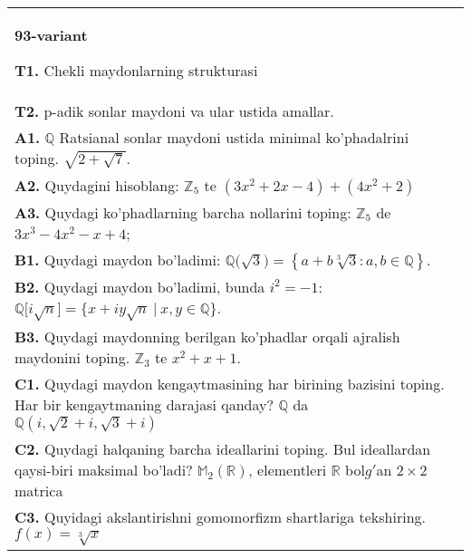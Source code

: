 \documentclass{article}
\begin{document}
\begin{tabular}{m{17cm}}
\textbf{93-variant}
\newline

\textbf{T1.} Chekli maydonlarning strukturasi \\
\textbf{T2.} p-adik sonlar maydoni va ular ustida amallar. \\
\textbf{A1.} \(\mathbb{Q}\) Ratsianal sonlar maydoni ustida minimal ko'phadalrini toping.
\(\sqrt{2 + \sqrt{7}}\). \\
\textbf{A2.} Quydagini hisoblang:
\(\mathbb{Z}_{5}\) te \(\left( 3x^{2} + 2x - 4 \right) + \left( 4x^{2} + 2 \right)\) \\
\textbf{A3.} Quydagi ko'phadlarning barcha nollarini toping:
\(\mathbb{Z}_{5}\) de \(3x^{3} - 4x^{2} - x + 4\); \\
\textbf{B1.} Quydagi maydon bo'ladimi:
\(\mathbb{Q(}\sqrt{3}) = \left\{ a + b\sqrt[3]{3}:a,b \in \mathbb{Q} \right\}\). \\
\textbf{B2.} Quydagi maydon bo'ladimi, bunda \(i^{2} = - 1\):
\(\mathbb{Q\lbrack}i\sqrt{n}\rbrack = \{ x + iy\sqrt{n}\ |\ x,y \in \mathbb{Q\}}\). \\
\textbf{B3.} Quydagi maydonning berilgan ko'phadlar orqali ajralish maydonini toping.
\(\mathbb{Z}_{3}\) te \(x^{2} + x + 1\). \\
\textbf{C1.} Quydagi maydon kengaytmasining har birining bazisini toping. Har bir kengaytmaning darajasi qanday?
\(\mathbb{Q}\) da \(\mathbb{Q}\left( i,\sqrt{2} + i,\sqrt{3} + i \right)\) \\
\textbf{C2.} Quydagi halqaning barcha ideallarini toping. Bul ideallardan qaysi-biri maksimal bo'ladi?
\(\mathbb{M}_{2}\left( \mathbb{R} \right)\), elementleri \(\mathbb{R}\) bol\(g'\)an \(2 \times 2\) matrica \\
\textbf{C3.} Quyidagi akslantirishni gomomorfizm shartlariga tekshiring. \(f(x) = \sqrt[3]{x}\) \\

\end{tabular}
\vspace{1cm}
\end{document}
